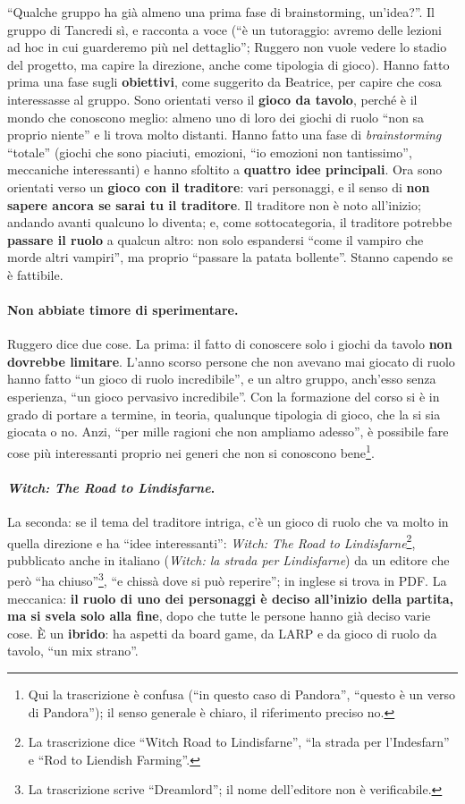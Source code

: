 ``Qualche gruppo ha già almeno una prima fase di brainstorming, un'idea?''. Il gruppo di
Tancredi sì, e racconta a voce (``è un tutoraggio: avremo delle lezioni ad hoc in cui
guarderemo più nel dettaglio''; Ruggero non vuole vedere lo stadio del progetto, ma
capire la direzione, anche come tipologia di gioco). Hanno fatto prima una fase sugli
\textbf{obiettivi}, come suggerito da Beatrice, per capire che cosa interessasse al
gruppo. Sono orientati verso il \textbf{gioco da tavolo}, perché è il mondo che
conoscono meglio: almeno uno di loro dei giochi di ruolo ``non sa proprio niente'' e
li trova molto distanti. Hanno fatto una fase di \emph{brainstorming} ``totale'' (giochi
che sono piaciuti, emozioni, ``io emozioni non tantissimo'', meccaniche interessanti)
e hanno sfoltito a \textbf{quattro idee principali}. Ora sono orientati verso un
\textbf{gioco con il traditore}: vari personaggi, e il senso di \textbf{non sapere
ancora se sarai tu il traditore}. Il traditore non è noto all'inizio; andando avanti
qualcuno lo diventa; e, come sottocategoria, il traditore potrebbe \textbf{passare il
ruolo} a qualcun altro: non solo espandersi ``come il vampiro che morde altri
vampiri'', ma proprio ``passare la patata bollente''. Stanno capendo se è fattibile.

\paragraph{Non abbiate timore di sperimentare.} Ruggero dice due cose. La prima: il
fatto di conoscere solo i giochi da tavolo \textbf{non dovrebbe limitare}. L'anno
scorso persone che non avevano mai giocato di ruolo hanno fatto ``un gioco di ruolo
incredibile'', e un altro gruppo, anch'esso senza esperienza, ``un gioco pervasivo
incredibile''. Con la formazione del corso si è in grado di portare a termine, in
teoria, qualunque tipologia di gioco, che la si sia giocata o no. Anzi, ``per mille
ragioni che non ampliamo adesso'', è possibile fare cose più interessanti proprio nei
generi che non si conoscono bene\footnote{Qui la trascrizione è confusa (``in questo
caso di Pandora'', ``questo è un verso di Pandora''); il senso generale è chiaro, il
riferimento preciso no.}.

\paragraph{\emph{Witch: The Road to Lindisfarne}.} La seconda: se il tema del
traditore intriga, c'è un gioco di ruolo che va molto in quella direzione e ha ``idee
interessanti'': \emph{Witch: The Road to Lindisfarne}\footnote{La trascrizione dice
``Witch Road to Lindisfarne'', ``la strada per l'Indesfarn'' e ``Rod to Liendish
Farming''.}, pubblicato anche in italiano (\emph{Witch: la strada per Lindisfarne})
da un editore che però ``ha chiuso''\footnote{La trascrizione scrive ``Dreamlord''; il
nome dell'editore non è verificabile.}, ``e chissà dove si può reperire''; in inglese
si trova in PDF. La meccanica: \textbf{il ruolo di uno dei personaggi è deciso
all'inizio della partita, ma si svela solo alla fine}, dopo che tutte le persone hanno
già deciso varie cose. È un \textbf{ibrido}: ha aspetti da board game, da LARP e da
gioco di ruolo da tavolo, ``un mix strano''.

